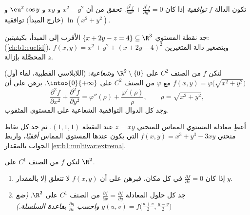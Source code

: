 \begin{exercise}[$\star\star$]\label{exo:b1:multivar:7}
تكون الدالة $f$ \emph{توافقية} إذا كان $\frac{\partial^2 f}{\partial
x^2} + \frac{\partial^2 f}{\partial y^2} = 0$. تحقق من أن $x^2 -
y^2$ و $xy$ و $\eu^x\cos y$ و $\ln(x^2 + y^2)$ (خارج المبدأ)
توافقية.
\end{exercise}

\begin{exercise}[$\star\star\star$]\label{exo:b1:multivar:8}
جد نقطة المستوي $\{x + 2y - z = 4\} \subseteq \R^3$
الأقرب إلى المبدأ، بكيفيتين: 
(\cref{ch:b1:euclid})، وبتصغير دالة المتغيرين
$f(x, y) = x^2 + y^2 + (x + 2y - 4)^2$ المحصَّلة بإزالة $z$.
\end{exercise}

\begin{exercise}[$\star\star\star$]\label{exo:b1:multivar:9}
(اللابلاسي  القطبية، لقاء أول) لتكن $f$ من الصنف $C^2$ على
$\R^2 \setminus \{0\}$ و\emph{شعاعية}: $f(x, y) =
\varphi\bigl(\sqrt{x^2+y^2}\bigr)$ مع $\varphi$ من الصنف $C^2$ على
$\intoo{0}{+\infty}$. برهن على أن
\[
\frac{\partial^2 f}{\partial x^2} + \frac{\partial^2 f}{\partial
y^2} = \varphi''(\rho) + \frac{\varphi'(\rho)}{\rho},
\qquad \rho = \sqrt{x^2 + y^2},
\]
وجد كل الدوال التوافقية الشعاعية على المستوي المثقوب.
\end{exercise}

\begin{exercise}[$\star\star$]\label{exo:b1:multivar:10}
أعطِ معادلة المستوي المماس للمنحني $z = xy$ عند
النقطة $(1, 1, 1)$. ثم جد كل نقاط منحني
$f(x,y) = x^3 + y^3 - 3xy$ التي يكون عندها المستوي المماس
\emph{أفقيًا}، واربط الجواب بالمقدار
\cref{ex:b1:multivar:extrema}.
\end{exercise}

\begin{exercise}[$\star\star$]\label{exo:b1:multivar:11}
لتكن $f$ من الصنف $C^1$ على $\R^2$.
\begin{enumerate}
  \item إذا كان $\frac{\partial f}{\partial x} = 0$ في كل مكان، فبرهن
        على أن $f(x, y)$ لا تتعلق إلا بالمقدار $y$.
  \item جد كل حلول المعادلة
        $\frac{\partial f}{\partial x} = \frac{\partial
        f}{\partial y}$ من الصنف $C^1$ على $\R^2$. \emph{(ضع $g(u, v) =
        f\bigl(\frac{u+v}2, \frac{u-v}2\bigr)$ واحسب
        $\frac{\partial g}{\partial v}$ بقاعدة السلسلة.)}
\end{enumerate}
\end{exercise}

